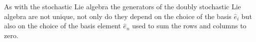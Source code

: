 As with the stochastic Lie algebra the generators of the doubly stochastic Lie 
algebra are not unique, not only do they depend on the choice of the basis $\hat{e}_i$ 
but also on the choice of the basis element $\hat{e}_n$ used to sum the rows and 
columns to zero.


